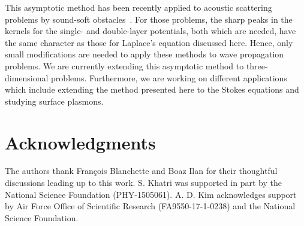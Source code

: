 \documentclass{article}[12pt]
\numberwithin{equation}{section}
\begin{document}
This asymptotic method has been recently applied to acoustic
scattering problems by sound-soft obstacles~\cite{carvalho2017}. For
those problems, the sharp peaks in the kernels for the single- and
double-layer potentials, both which are needed, have the same
character as those for Laplace's equation discussed here. Hence, only
small modifications are needed to apply these methods to wave
propagation problems.  We are currently extending this asymptotic
method to three-dimensional problems.  Furthermore, we are working on
different applications which include extending the method presented
here to the Stokes equations and studying surface plasmons.

\section*{Acknowledgments}


The authors thank Fran\c{c}ois Blanchette and Boaz Ilan for their
thoughtful discussions leading up to this work.  S. Khatri was
supported in part by the National Science
Foundation (PHY-1505061). A. D. Kim acknowledges support by Air
  Force Office of Scientific Research (FA9550-17-1-0238) and the
  National Science Foundation.
\end{document}
